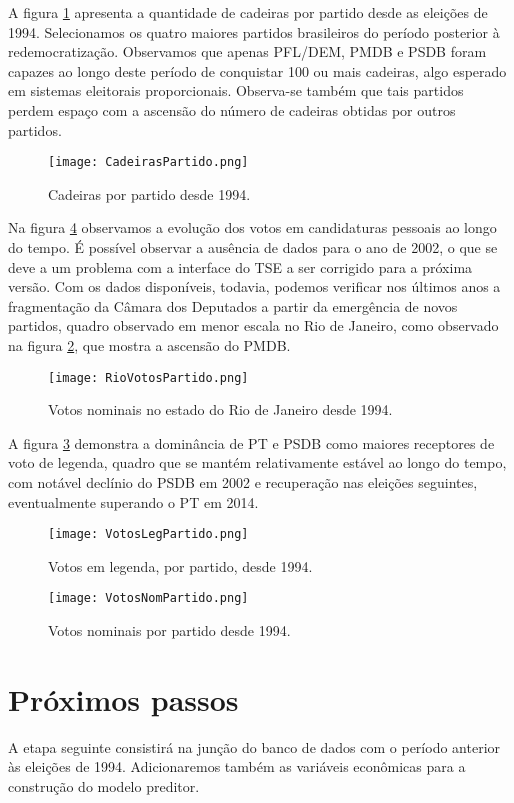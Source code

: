 \documentclass[
	article,			%
	11pt,				%
	oneside,			%
	a4paper,			%
	english,			%
	brazil,				%
	sumario=tradicional
	]{abntex2}
\begin{document}
A figura \ref{fig:cadeiras-partido}  apresenta a quantidade de cadeiras por partido desde as eleições de 1994. Selecionamos os quatro maiores partidos brasileiros do período posterior à redemocratização. Observamos que apenas PFL/DEM, PMDB e PSDB foram capazes ao longo deste período de conquistar 100 ou mais cadeiras, algo esperado em sistemas eleitorais proporcionais. Observa-se também que tais partidos perdem espaço com a ascensão do número de cadeiras obtidas por outros partidos. 

\begin{figure}
	\centering
	\texttt{[image: CadeirasPartido.png]}
	\caption{Cadeiras por partido desde 1994.}
	\label{fig:cadeiras-partido}
\end{figure}

Na figura \ref{fig:votos-nominais-partido} observamos a evolução dos votos em candidaturas pessoais ao longo do tempo. É possível observar a ausência de dados para o ano de 2002, o que se deve a um problema com a interface do TSE a ser corrigido para a próxima versão. Com os dados disponíveis, todavia, podemos verificar nos últimos anos a fragmentação da Câmara dos Deputados a partir da emergência de novos partidos, quadro observado em menor escala no Rio de Janeiro, como observado na figura \ref{fig:votos-partido-rio}, que mostra a ascensão do PMDB. 

\begin{figure}
	\centering
	\texttt{[image: RioVotosPartido.png]}
	\caption{Votos nominais no estado do Rio de Janeiro desde 1994.}
	\label{fig:votos-partido-rio}
\end{figure}

A figura \ref{fig:votos-leg} demonstra a dominância de PT e PSDB como maiores receptores de voto de legenda, quadro que se mantém relativamente estável ao longo do tempo, com notável declínio do PSDB em 2002 e recuperação nas eleições seguintes, eventualmente superando o PT em 2014.

\begin{figure}
	\centering
	\texttt{[image: VotosLegPartido.png]}
	\caption{Votos em legenda, por partido, desde 1994.}
	\label{fig:votos-leg}
\end{figure}

\begin{figure}
	\centering
	\texttt{[image: VotosNomPartido.png]}
	\caption{Votos nominais por partido desde 1994.}
	\label{fig:votos-nominais-partido}
\end{figure}

\section*{Próximos passos}

A etapa seguinte consistirá na junção do banco de dados com o período anterior às eleições de 1994. Adicionaremos também as variáveis econômicas para a construção do modelo preditor.


\end{document}
